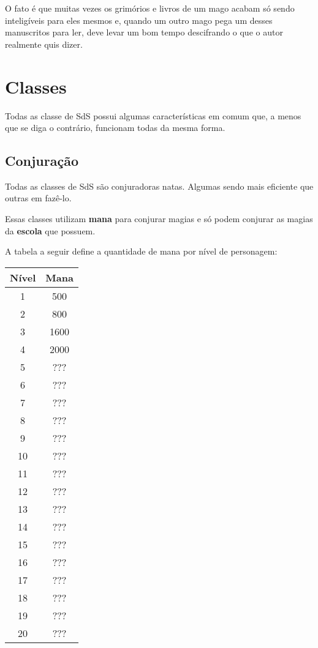 \documentclass{RPG_Adventure}[2021/10/20]
\begin{document}
O fato é que muitas vezes os grimórios e livros de um mago acabam só sendo
inteligíveis para eles mesmos e, quando um outro mago pega um desses manuscritos
para ler, deve levar um bom tempo descifrando o que o autor realmente quis
dizer.



\chapter{Classes}%
\label{cha:classe}

Todas as classe de SdS possui algumas características em comum que, a menos que
se diga o contrário, funcionam todas da mesma forma.

\section*{Conjuração}%

Todas as classes de SdS são conjuradoras natas. Algumas sendo mais eficiente que
outras em fazê-lo.

Essas classes utilizam \textbf{mana} para conjurar magias e só podem conjurar as
magias da \textbf{escola} que possuem.

A tabela a seguir define a quantidade de mana por nível de personagem:

\begin{center}
\begin{tabular}{|||c||c|||}
    \hline
    \textbf{Nível} & \textbf{Mana} \\
    \hline
    \hline
    1 & 500 \\
    \hline
    2 & 800 \\
    \hline
    3 & 1600 \\
    \hline
    4 & 2000 \\
    \hline
    5 & ??? \\
    \hline
    6 & ??? \\
    \hline
    7 & ??? \\
    \hline
    8 & ??? \\
    \hline
    9 & ??? \\
    \hline
    10 & ??? \\
    \hline
    11 & ??? \\
    \hline
    12 & ??? \\
    \hline
    13 & ??? \\
    \hline
    14 & ??? \\
    \hline
    15 & ??? \\
    \hline
    16 & ??? \\
    \hline
    17 & ??? \\
    \hline
    18 & ??? \\
    \hline
    19 & ??? \\
    \hline
    20 & ??? \\
    \hline
\end{tabular}
\end{center}
\end{document}
